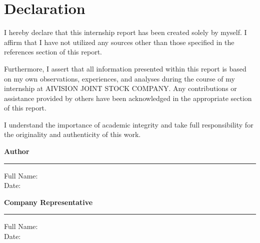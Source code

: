 \chapter*{Declaration}

I hereby declare that this internship report has been created solely by myself. I affirm that I have not utilized any sources other than those specified in the references section of this report.

Furthermore, I assert that all information presented within this report is based on my own observations, experiences, and analyses during the course of my internship at AIVISION JOINT STOCK COMPANY. Any contributions or assistance provided by others have been acknowledged in the appropriate section of this report.

I understand the importance of academic integrity and take full responsibility for the originality and authenticity of this work.

\vspace{4.2cm}

\noindent
\begin{minipage}[t]{0.45\textwidth}
    \textbf{Author}\\[4cm]
    \hrule
    \vspace{0.5cm}
    \noindent Full Name: \underline{\hspace{5cm}}\\[0.4cm]
    Date: \underline{\hspace{6cm}}
\end{minipage}
\hfill
\begin{minipage}[t]{0.45\textwidth}
    \textbf{Company Representative}\\[4cm]
    \hrule
    \vspace{0.5cm}
    \noindent Full Name: \underline{\hspace{5cm}}\\[0.4cm]
    Date: \underline{\hspace{6cm}}
\end{minipage}
